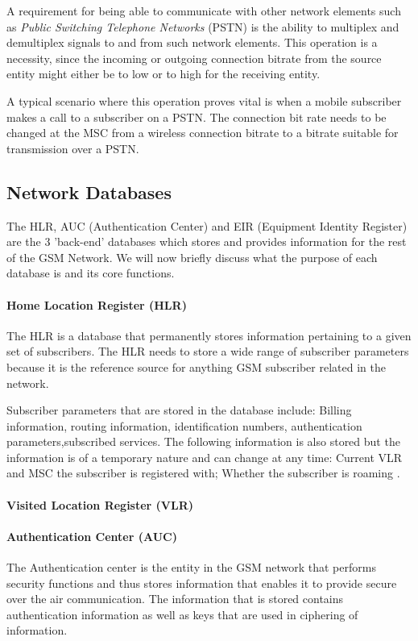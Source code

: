A requirement for being able to communicate with other network elements such as \emph{Public Switching Telephone Networks} (PSTN) is the ability to multiplex and demultiplex signals to and from such network elements. This operation is a necessity, since the incoming or outgoing connection bitrate from the source entity might either be to low or to high for the receiving entity.

A typical scenario where this operation proves vital is when a mobile subscriber makes a call to a subscriber on a PSTN. The connection bit rate needs to be changed at the MSC from a wireless connection bitrate to a bitrate suitable for transmission over a PSTN.

\subsection{Network Databases}
The HLR, AUC (Authentication Center) and EIR (Equipment Identity Register) are the 3 'back-end' databases which stores and provides information for the rest of the GSM Network. We will now briefly discuss what the purpose of each database is and its core functions.

\paragraph{Home Location Register (HLR)}
The HLR is a database that permanently stores information pertaining to a given set of subscribers. The HLR needs to store a wide range of subscriber parameters because it is the reference source for anything GSM subscriber related in the network. 

Subscriber parameters that are stored in the database include: Billing information, routing information, identification numbers, authentication parameters,subscribed services. The following information is also stored but the information is of a temporary nature and can change at any time: Current VLR and MSC the subscriber is registered with; Whether the subscriber is roaming \cite{GSMSysEngin}.

\paragraph{Visited Location Register (VLR)}

\paragraph{Authentication Center (AUC)}
The Authentication center is the entity in the GSM network that performs security functions and thus stores information that enables it to provide secure over the air communication\cite{GSM92,GSMSysEngin}. The information that is stored contains authentication information as well as keys that are used in ciphering of information\cite{GSM92,GSMSysEngin}.

